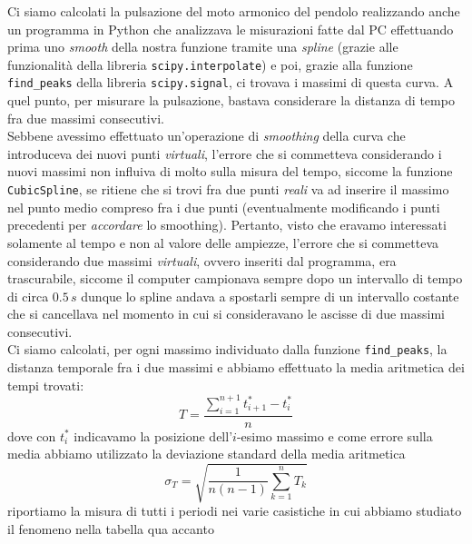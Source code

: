 \documentclass{article}
\begin{document}
Ci siamo calcolati la pulsazione del moto armonico del pendolo realizzando anche un programma in Python che analizzava le misurazioni fatte dal PC effettuando prima uno \emph{smooth} della nostra funzione tramite una \emph{spline} (grazie alle funzionalità della libreria \texttt{scipy.interpolate}) e poi, grazie alla funzione \texttt{find\_peaks} della libreria \texttt{scipy.signal}, ci trovava i massimi di questa curva. A quel punto, per misurare la pulsazione, bastava considerare la distanza di tempo fra due massimi consecutivi. \\ Sebbene avessimo effettuato un'operazione di \emph{smoothing} della curva che introduceva dei nuovi punti \emph{virtuali}, l'errore che si commetteva considerando i nuovi massimi non influiva di molto sulla misura del tempo, siccome la funzione \texttt{CubicSpline}, se ritiene che si trovi fra due punti \emph{reali} va ad inserire il massimo nel punto medio compreso fra i due punti (eventualmente modificando i punti precedenti per \emph{accordare} lo smoothing). Pertanto, visto che eravamo interessati solamente al tempo e non al valore delle ampiezze, l'errore che si commetteva considerando due massimi \emph{virtuali}, ovvero inseriti dal programma, era trascurabile, siccome il computer campionava sempre dopo un intervallo di tempo di circa $0.5 \, s$ dunque lo spline andava a spostarli sempre di un intervallo costante che si cancellava nel momento in cui si consideravano le ascisse di due massimi consecutivi. \\
Ci siamo calcolati, per ogni massimo individuato dalla funzione \texttt{find\_peaks}, la distanza temporale fra i due massimi e abbiamo effettuato la media aritmetica dei tempi trovati:
\begin{equation}
	T = \frac{\sum\limits_{i=1}^{n+1} t^{*}_{i+1} - t^{*}_i}{n}
\end{equation}
dove con $t^{*}_{i}$ indicavamo la posizione dell'$i$-esimo massimo e come errore sulla media abbiamo utilizzato la deviazione standard della media aritmetica
\begin{equation}
	\sigma_{T} = \sqrt{\frac{1}{n(n-1)}\sum_{k=1}^{n}{T_k}}
\end{equation}
riportiamo la misura di tutti i periodi nei varie casistiche in cui abbiamo studiato il fenomeno nella tabella qua accanto
\end{document}
